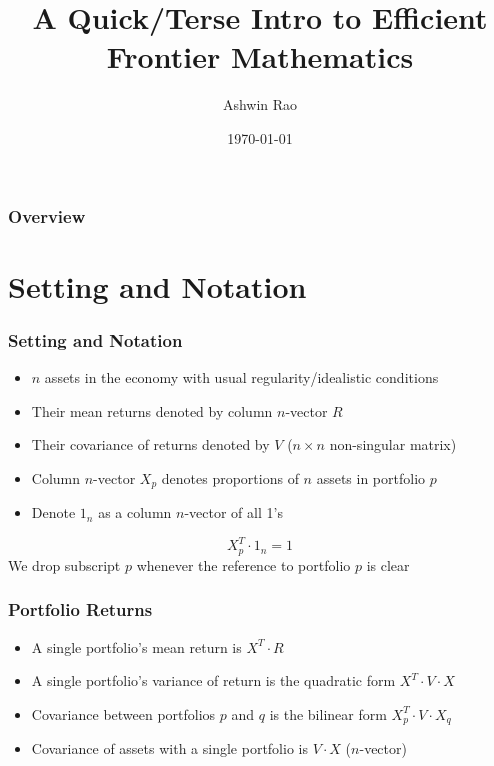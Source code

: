 \documentclass{beamer}
\title[Efficient Frontier Mathematics]{A Quick/Terse Intro to Efficient Frontier Mathematics} %
\author{Ashwin Rao} %
{
}
\date{\today} %
\begin{document}
\begin{frame}
\titlepage %
\end{frame}

\begin{frame}
\frametitle{Overview} %
\tableofcontents %
\end{frame}

\section{Setting and Notation}

\begin{frame}
\frametitle{Setting and Notation}
\begin{itemize}
\item $n$ assets in the economy with usual regularity/idealistic conditions
\item Their mean returns denoted by column $n$-vector $R$
\item Their covariance of returns denoted by $V$ ($n \times n$ non-singular matrix)
\item Column $n$-vector $X_p$ denotes proportions of $n$ assets in portfolio $p$
\item Denote $1_n$ as a column $n$-vector of all 1's
\end{itemize}
$$X_p^T \cdot 1_n = 1$$
We drop subscript $p$ whenever the reference to portfolio $p$ is clear
\end{frame}

\begin{frame}
\frametitle{Portfolio Returns}
\begin{itemize}
\item A single portfolio's mean return is $X^T \cdot R$
\item A single portfolio's variance of return is the quadratic form $X^T \cdot V \cdot X$
\item Covariance between portfolios $p$ and $q$ is the bilinear form $X_p^T \cdot V \cdot X_q$
\item Covariance of assets with a single portfolio is $V \cdot X$ ($n$-vector)
\end{itemize}
\end{frame}
\end{document}
